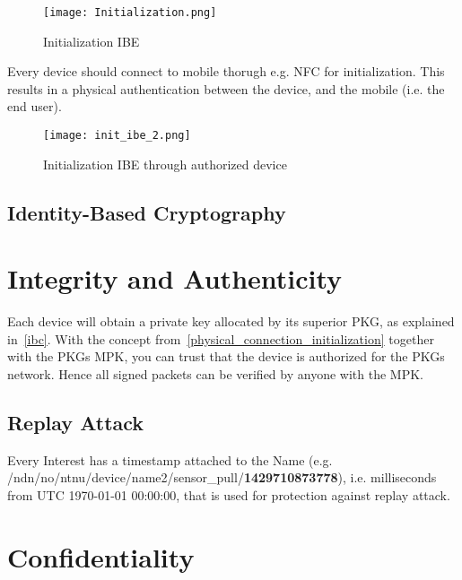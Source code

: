 \begin{figure}[ht]
  \centering
  \texttt{[image: Initialization.png]}
  \caption{Initialization IBE}
  \label{fig:init_ibe_1}
\end{figure}

Every device should connect to mobile thorugh e.g. \gls{NFC} for initialization.
This results in a physical authentication between the device, and the mobile (i.e. the end user).

\begin{figure}[ht]
  \centering
  \texttt{[image: init\_ibe\_2.png]}
  \caption{Initialization IBE through authorized device}
  \label{fig:init_ibe_2}
\end{figure}



\subsection{Identity-Based Cryptography}

\section{Integrity and Authenticity}

Each device will obtain a private key allocated by its superior \gls{PKG}, as explained in~\autoref{ibc}.
With the concept from~\autoref{physical_connection_initialization} together with the \gls{PKG}s \gls{MPK}, you can trust that the device is authorized for the \gls{PKG}s network. Hence all signed packets can be verified by anyone with the \gls{MPK}.

\subsection{Replay Attack}
Every Interest has a timestamp attached to the Name (e.g. /ndn/no/ntnu/device/name2/sensor\_pull/\textbf{1429710873778}), i.e. milliseconds from UTC 1970-01-01 00:00:00, that is used for protection against replay attack. 

\section{Confidentiality}

